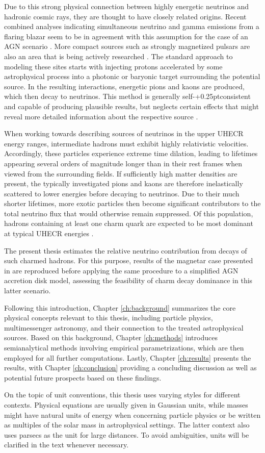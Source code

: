 Due to this strong physical connection between highly energetic neutrinos and hadronic cosmic rays, they are thought to have
closely related origins. Recent combined analyses indicating simultaneous neutrino and gamma emissions from a
flaring blazar seem to be in agreement with this assumption for the case of an AGN scenario \cite{ic_blazar_flare, ic_blazar_signal}.
More compact sources such as strongly magnetized pulsars are also an area that is being actively researched \cite{Murase_2009}.
The standard approach to modeling these sites starts with injecting protons accelerated by some astrophysical process into
a photonic or baryonic target surrounding the potential source. In the resulting interactions, energetic pions and kaons are
produced, which then decay to neutrinos. This method is generally self-{\kern+0.25pt}consistent and capable of producing
plausible results, but neglects certain effects that might reveal more detailed information about the respective source
\cite{Carpio_2020}.

When working towards describing sources of neutrinos in the upper UHECR energy ranges, intermediate hadrons must exhibit
highly relativistic velocities. Accordingly, these particles experience extreme time dilation, leading to lifetimes
appearing several orders of magnitude longer than in their rest frames when viewed from the surrounding fields.
If sufficiently high matter densities are present, the typically investigated pions and kaons are therefore inelastically
scattered to lower energies before decaying to neutrinos. Due to their much shorter lifetimes, more exotic particles then
become significant contributors to the total neutrino flux that would otherwise remain suppressed. Of this population,
hadrons containing at least one charm quark are expected to be most dominant at typical UHECR energies \cite{Tjus_2023}.

The present thesis estimates the relative neutrino contribution from decays of such charmed hadrons. For this purpose, results
of the magnetar case presented in \cite{Carpio_2020} are reproduced before applying the same procedure to a simplified AGN
accretion disk model, assessing the feasibility of charm decay dominance in this latter scenario.

Following this introduction, Chapter \ref{ch:background} summarizes the core physical concepts relevant to this thesis,
including particle physics, multimessenger astronomy, and their connection to the treated astrophysical sources. Based
on this background, Chapter \ref{ch:methods} introduces semianalytical methods involving empirical parametrizations,
which are then employed for all further computations. Lastly, Chapter \ref{ch:results} presents the results, with Chapter
\ref{ch:conclusion} providing a concluding discussion as well as potential future prospects based on these findings.

On the topic of unit conventions, this thesis uses varying styles for different contexts. Physical equations are usually given
in Gaussian units, while masses might have natural units of energy when concerning particle physics or be written as multiples
of the solar mass in astrophysical settings. The latter context also uses parsecs as the unit for large distances.
To avoid ambiguities, units will be clarified in the text whenever necessary.
